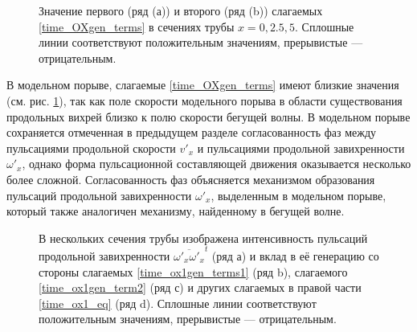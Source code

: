 \begin{figure}[h]
\caption{Значение первого (ряд (а)) и второго (ряд (b)) слагаемых \eqref{time_OXgen_terms} в сечениях трубы $x=0,2.5,5$. Сплошные линии соответствуют положительным значениям, прерывистые --- отрицательным.}
\label{OXgen_terms_cmp_pic}
\end{figure}

В модельном порыве, слагаемые \eqref{time_OXgen_terms} имеют близкие значения (см. рис. \ref{OXgen_terms_cmp_pic}), так как поле скорости модельного порыва в области существования продольных вихрей близко к полю скорости бегущей волны. В модельном порыве сохраняется отмеченная в предыдущем разделе согласованность фаз между пульсациями продольной скорости $v'_x$ и пульсациями продольной завихренности $\omega'_x$, однако форма пульсационной составляющей движения оказывается несколько более сложной. Согласованность фаз объясняется механизмом образования пульсаций продольной завихренности $\omega'_x$, выделенным в модельном порыве, который также аналогичен механизму, найденному в бегущей волне. 

\begin{figure}[h!]
\caption{В нескольких сечения трубы изображена интенсивность пульсаций продольной завихренности $\overline{\omega'_x \omega'_x}^t$ (ряд а) и вклад в её генерацию со стороны слагаемых \eqref{time_ox1gen_terms1} (ряд b), слагаемого \eqref{time_ox1gen_term2} (ряд с) и других слагаемых в правой части \eqref{time_ox1_eq} (ряд d). Сплошные линии соответствуют положительным значениям, прерывистые --- отрицательным.}
\label{mp_ox1gen_pic}
\end{figure}

